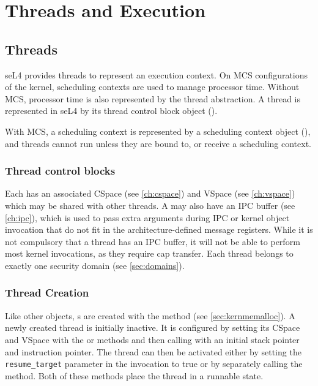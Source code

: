 %
%
%

\chapter{\label{ch:threads}Threads and Execution}

\section{Threads}
\label{sec:threads}


seL4 provides threads to represent an execution context. On MCS configurations of
the kernel, scheduling contexts are used to manage processor time. Without MCS, processor
time is also represented by the thread abstraction.
A thread is represented in seL4 by its thread control block
object ().

With MCS, a scheduling context is represented by a scheduling context object
(), and threads cannot run unless they are bound to, or receive a
scheduling context.

\subsection{Thread control blocks}

Each  has an associated CSpace (see
\autoref{ch:cspace}) and VSpace (see \autoref{ch:vspace}) which
may be shared with other threads. A  may also have an IPC buffer
(see  \autoref{ch:ipc}), which is used to pass extra arguments during IPC
or kernel object invocation that do not fit in the architecture-defined message
registers. While it is not compulsory that a thread has an IPC buffer,
it will not be able to perform most kernel invocations, as they require
cap transfer.
Each thread belongs to exactly one security domain (see
\autoref{sec:domains}).

\subsection{Thread Creation}
\label{sec:thread_creation}

Like other objects, s are created with the
 method (see
\autoref{sec:kernmemalloc}). A newly created thread is initially inactive. It
is configured by setting its CSpace and VSpace with the
or  methods and then calling
 with an initial stack pointer and instruction
pointer. The thread can then be activated either by setting the
\texttt{resume\_target} parameter in the  invocation to true
or by separately calling the  method. Both of these methods
place the thread in a runnable state.

